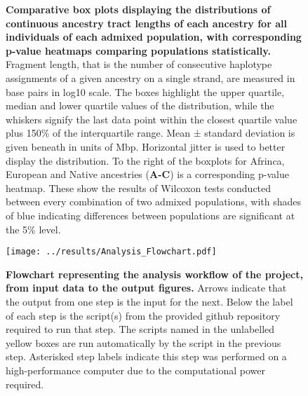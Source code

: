 \documentclass[11pt]{article}
\begin{document}
\begin{figure}[htb!]%
    \centering
     \hspace*{0em}
        \vspace{-0.6cm}
        \caption{\textbf{
            Comparative box plots displaying the distributions of continuous ancestry tract lengths of each ancestry for all individuals of each admixed population, with corresponding p-value heatmaps comparing populations statistically.
        }
            Fragment length, that is the number of consecutive haplotype assignments of a given ancestry on a single strand, are measured in base pairs in log10 scale. The boxes highlight the upper quartile, median and lower quartile values of the distribution, while the whiskers signify the last data point within the closest quartile value plus 150\% of the interquartile range. Mean ± standard deviation is given beneath in units of Mbp. Horizontal jitter is used to better display the distribution. To the right of the boxplots for Afrinca, European and Native ancestries (\textbf{A-C}) is a corresponding p-value heatmap. These show the results of Wilcoxon tests conducted between every combination of two admixed populations, with shades of blue indicating differences between populations are significant at the 5\% level.
        }
\end{figure}




\begin{figure}[htb!]%
    \centering
    \texttt{[image: ../results/Analysis\_Flowchart.pdf]} 
    \vspace{-2.5cm}
    \caption{\textbf{
        Flowchart representing the analysis workflow of the project, from input data to the output figures. 
    }
        Arrows indicate that the output from one step is the input for the next. Below the label of each step is the script(s) from the provided github repository required to run that step. The scripts named in the unlabelled yellow boxes are run automatically by the script in the previous step. Asterisked step labels indicate this step was performed on a high-performance computer due to the computational power required.
    }
\end{figure}
\end{document}
